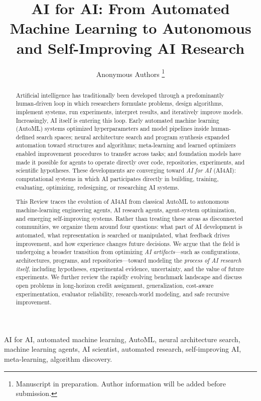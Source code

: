 \documentclass[journal]{IEEEtran}
\title{AI for AI: From Automated Machine Learning to Autonomous and Self-Improving AI Research}
\author{Anonymous Authors%
\thanks{Manuscript in preparation. Author information will be added before submission.}%
}
\begin{document}
\maketitle

\begin{abstract}
Artificial intelligence has traditionally been developed through a predominantly human-driven loop in which researchers formulate problems, design algorithms, implement systems, run experiments, interpret results, and iteratively improve models. Increasingly, AI itself is entering this loop. Early automated machine learning (AutoML) systems optimized hyperparameters and model pipelines inside human-defined search spaces; neural architecture search and program synthesis expanded automation toward structures and algorithms; meta-learning and learned optimizers enabled improvement procedures to transfer across tasks; and foundation models have made it possible for agents to operate directly over code, repositories, experiments, and scientific hypotheses. These developments are converging toward \emph{AI for AI} (AI4AI): computational systems in which AI participates directly in building, training, evaluating, optimizing, redesigning, or researching AI systems.

This Review traces the evolution of AI4AI from classical AutoML to autonomous machine-learning engineering agents, AI research agents, agent-system optimization, and emerging self-improving systems. Rather than treating these areas as disconnected communities, we organize them around four questions: what part of AI development is automated, what representation is searched or manipulated, what feedback drives improvement, and how experience changes future decisions. We argue that the field is undergoing a broader transition from optimizing \emph{AI artifacts}---such as configurations, architectures, programs, and repositories---toward modeling the \emph{process of AI research itself}, including hypotheses, experimental evidence, uncertainty, and the value of future experiments. We further review the rapidly evolving benchmark landscape and discuss open problems in long-horizon credit assignment, generalization, cost-aware experimentation, evaluator reliability, research-world modeling, and safe recursive improvement.
\end{abstract}

\begin{IEEEkeywords}
AI for AI, automated machine learning, AutoML, neural architecture search, machine learning agents, AI scientist, automated research, self-improving AI, meta-learning, algorithm discovery.
\end{IEEEkeywords}
\end{document}
